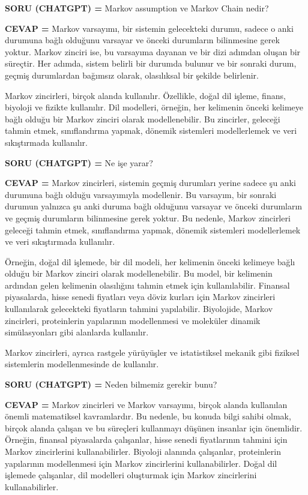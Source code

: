 \documentclass[11pt]{article}
\begin{document}
\textbf{SORU (CHATGPT) =} Markov assumption ve Markov Chain nedir?

\textbf{CEVAP =} Markov varsayımı, bir sistemin gelecekteki durumu, sadece o anki durumuna bağlı olduğunu varsayar ve önceki durumların bilinmesine gerek yoktur. Markov zinciri ise, bu varsayıma dayanan ve bir dizi adımdan oluşan bir süreçtir. Her adımda, sistem belirli bir durumda bulunur ve bir sonraki durum, geçmiş durumlardan bağımsız olarak, olasılıksal bir şekilde belirlenir.

Markov zincirleri, birçok alanda kullanılır. Özellikle, doğal dil işleme, finans, biyoloji ve fizikte kullanılır. Dil modelleri, örneğin, her kelimenin önceki kelimeye bağlı olduğu bir Markov zinciri olarak modellenebilir. Bu zincirler, geleceği tahmin etmek, sınıflandırma yapmak, dönemik sistemleri modellerlemek ve veri sıkıştırmada kullanılır.


\textbf{SORU (CHATGPT) =} Ne işe yarar?

\textbf{CEVAP =} Markov zincirleri, sistemin geçmiş durumları yerine sadece şu anki durumuna bağlı olduğu varsayımıyla modellenir. Bu varsayım, bir sonraki durumun yalnızca şu anki duruma bağlı olduğunu varsayar ve önceki durumların ve geçmiş durumların bilinmesine gerek yoktur. Bu nedenle, Markov zincirleri geleceği tahmin etmek, sınıflandırma yapmak, dönemik sistemleri modellerlemek ve veri sıkıştırmada kullanılır.

Örneğin, doğal dil işlemede, bir dil modeli, her kelimenin önceki kelimeye bağlı olduğu bir Markov zinciri olarak modellenebilir. Bu model, bir kelimenin ardından gelen kelimenin olasılığını tahmin etmek için kullanılabilir. Finansal piyasalarda, hisse senedi fiyatları veya döviz kurları için Markov zincirleri kullanılarak gelecekteki fiyatların tahmini yapılabilir. Biyolojide, Markov zincirleri, proteinlerin yapılarının modellenmesi ve moleküler dinamik simülasyonları gibi alanlarda kullanılır.

Markov zincirleri, ayrıca rastgele yürüyüşler ve istatistiksel mekanik gibi fiziksel sistemlerin modellenmesinde de kullanılır.


\textbf{SORU (CHATGPT) =} Neden bilmemiz gerekir bunu?

\textbf{CEVAP =} Markov zincirleri ve Markov varsayımı, birçok alanda kullanılan önemli matematiksel kavramlardır. Bu nedenle, bu konuda bilgi sahibi olmak, birçok alanda çalışan ve bu süreçleri kullanmayı düşünen insanlar için önemlidir. Örneğin, finansal piyasalarda çalışanlar, hisse senedi fiyatlarının tahmini için Markov zincirlerini kullanabilirler. Biyoloji alanında çalışanlar, proteinlerin yapılarının modellenmesi için Markov zincirlerini kullanabilirler. Doğal dil işlemede çalışanlar, dil modelleri oluşturmak için Markov zincirlerini kullanabilirler.
\end{document}
